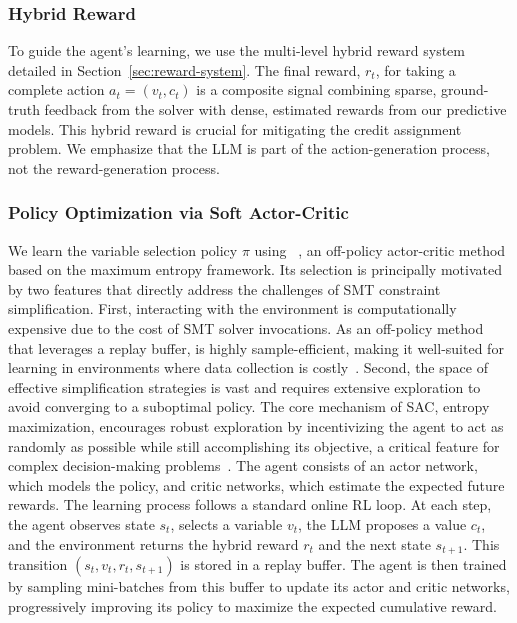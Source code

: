 \subsubsection{Hybrid Reward}
To guide the agent's learning, we use the multi-level hybrid reward system detailed in Section~\ref{sec:reward-system}. The final reward, $r_t$, for taking a complete action $a_t = (v_t, c_t)$ is a composite signal combining sparse, ground-truth feedback from the solver with dense, estimated rewards from our predictive models. This hybrid reward is crucial for mitigating the credit assignment problem. We emphasize that the LLM is part of the action-generation process, not the reward-generation process.

\subsubsection{Policy Optimization via Soft Actor-Critic}
We learn the variable selection policy $\pi$ using \SAC{}~\cite{haarnoja2018soft}, an off-policy actor-critic method based on the maximum entropy framework. Its selection is principally motivated by two features that directly address the challenges of SMT constraint simplification. First, interacting with the environment is computationally expensive due to the cost of SMT solver invocations. As an off-policy method that leverages a replay buffer, \SAC{} is highly sample-efficient, making it well-suited for learning in environments where data collection is costly~\cite{levine2020offline}. Second, the space of effective simplification strategies is vast and requires extensive exploration to avoid converging to a suboptimal policy. The core mechanism of SAC, entropy maximization, encourages robust exploration by incentivizing the agent to act as randomly as possible while still accomplishing its objective, a critical feature for complex decision-making problems~\cite{haarnoja2018soft}. The \SAC{} agent consists of an actor network, which models the policy, and critic networks, which estimate the expected future rewards. The learning process follows a standard online RL loop. At each step, the agent observes state $s_t$, selects a variable $v_t$, the LLM proposes a value $c_t$, and the environment returns the hybrid reward $r_t$ and the next state $s_{t+1}$. This transition $(s_t, v_t, r_t, s_{t+1})$ is stored in a replay buffer. The agent is then trained by sampling mini-batches from this buffer to update its actor and critic networks, progressively improving its policy to maximize the expected cumulative reward.

